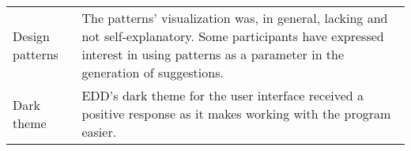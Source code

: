 \begin{table*}[ht]
{\begin{tabularx}{\textwidth}{|p{}|p{}|}
Design \newline  patterns& The patterns’ visualization was, in general, lacking and not self-explanatory. Some participants have expressed interest in using patterns as a parameter in the generation of suggestions.                                                                                                                                                                                                                                     \\\cline{1-2}
Dark theme                                  & EDD’s dark theme for the user interface received a positive response as it makes working with the program easier.
	\\ \cline{1-2}
\end{tabularx}
}
\end{table*}

